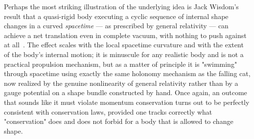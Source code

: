 Perhaps the most striking illustration of the underlying idea is Jack
Wisdom's result that a quasi-rigid body executing a cyclic sequence
of internal shape changes in a curved \emph{spacetime} --- as
prescribed by general relativity --- can achieve a net translation
even in complete vacuum, with nothing to push against at
all~\cite{wisdom}. The effect scales with the local spacetime
curvature and with the extent of the body's internal motion; it is
minuscule for any realistic body and is not a practical propulsion
mechanism, but as a matter of principle it is "swimming" through
spacetime using exactly the same holonomy mechanism as the falling
cat, now realized by the genuine nonlinearity of general relativity
rather than by a gauge potential on a shape bundle constructed by
hand. Once again, an outcome that sounds like it must violate
momentum conservation turns out to be perfectly consistent with
conservation laws, provided one tracks correctly what "conservation"
does and does not forbid for a body that is allowed to change shape.
